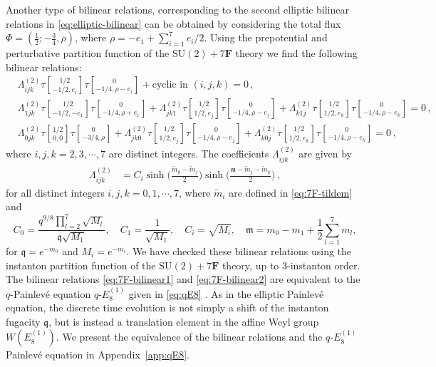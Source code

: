 \documentclass[11pt, a4paper]{article}
\newcommand{\tauftn}[2]{\tau\genfrac[]{0pt}{1}{#1}{#2}}
\theoremstyle{definition}
\begin{document}
Another type of bilinear relations, corresponding to the second elliptic bilinear relations in \eqref{eq:elliptic-bilinear} can be obtained by considering the total flux $ \Phi = (\frac{1}{2}; -\frac{3}{4}, \rho) $, where $ \rho = -e_1 + \sum_{i=1}^7 e_i/2 $. Using the prepotential and perturbative partition function of the $ \mathrm{SU}(2)+7\mathbf{F} $ theory we find the following bilinear relations:
\begin{align}\label{eq:7F-bilinear2}
    &\Lambda_{ijk}^{(2)} \tauftn{1/2}{-1/2, e_i} \tauftn{0}{-1/4, \rho-e_i} + \text{cyclic in } (i,j,k) = 0 \, , \\
    &\Lambda_{1jk}^{(2)} \tauftn{1/2}{-1/2, -e_1} \tauftn{0}{-1/4, \rho+e_1} + \Lambda_{jk1}^{(2)} \tauftn{1/2}{1/2,e_j} \tauftn{0}{-1/4,\rho-e_j} + \Lambda_{k1j}^{(2)} \tauftn{1/2}{1/2,e_k} \tauftn{0}{-1/4,\rho-e_k} = 0 \, , \nonumber \\
    &\Lambda_{0jk}^{(2)} \tauftn{1/2}{0,0} \tauftn{0}{-3/4,\rho} + \Lambda_{jk0}^{(2)} \tauftn{1/2}{1/2,e_j} \tauftn{0}{-1/4,\rho-e_j} + \Lambda_{k0j}^{(2)} \tauftn{1/2}{1/2,e_k} \tauftn{0}{-1/4,\rho-e_k} = 0 \, , \nonumber
\end{align}
where $ i,j,k = 2,3,\cdots,7 $ are distinct integers. The coefficients $ \Lambda_{ijk}^{(2)} $ are given by
\begin{align}\label{eq:7F-bilinear2-Lambda}
    \Lambda_{ijk}^{(2)} &= C_i \sinh\Big(\frac{\tilde{m}_k-\tilde{m}_j}{2}\Big) \sinh\Big(\frac{\mathfrak{m} - \tilde{m}_j - \tilde{m}_k}{2}\Big) \, ,
\end{align}
for all distinct integers $ i,j,k=0,1,\cdots,7 $, where $ \tilde{m}_i $ are defined in \eqref{eq:7F-tildem} and
\begin{equation}\label{eq:7F-C}
    C_0 = \frac{q^{9/8}\prod_{l=2}^7 \sqrt{M_l}}{\mathfrak{q} \sqrt{M_1}} , \quad C_1 = \frac{1}{\sqrt{M_1}} , \quad C_i = \sqrt{M_i} ,  \quad
    \mathfrak{m} = m_0 - m_1 + \frac{1}{2} \sum_{l=1}^7 m_l ,
\end{equation}
for $ \mathfrak{q}=e^{-m_0} $ and $ M_i=e^{-m_i} $. We have checked these bilinear relations using the instanton partition function of the $ \mathrm{SU}(2)+7\mathbf{F} $ theory, up to 3-instanton order. The bilinear relations \eqref{eq:7F-bilinear1} and \eqref{eq:7F-bilinear2} are equivalent to the $ q $-Painlev\'e equation $ q\text{-}E_8^{(1)} $ given in \eqref{eq:qE8} \cite{Masuda:2011}. As in the elliptic Painlev\'e equation, the discrete time evolution is not simply a shift of the instanton fugacity $ \mathfrak{q} $, but is instead a translation element in the affine Weyl group $ W(E_8^{(1)}) $. We present the equivalence of the bilinear relations and the $ q\text{-}E_8^{(1)} $ Painlev\'e equation in Appendix~\ref{app:qE8}.
\end{document}
